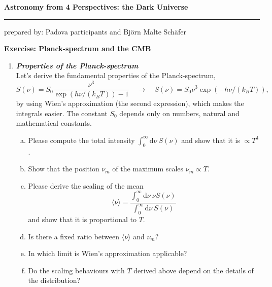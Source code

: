 \documentclass[a4paper,12pt]{article}
\newcommand{\question}[1]{\textbf{\textit{#1}}}
\newcommand{\HRule}{\rule{\linewidth}{0.3mm}}
\newcommand{\dd}{\mathrm{d}}
\newcommand{\bra}{\langle}
\newcommand{\ket}{\rangle}
\begin{document}
\pagestyle{empty}

\begin{center}
\LARGE \textbf{Astronomy from 4 Perspectives: the Dark Universe}
\HRule
\end{center}
\begin{flushright}
prepared by: Padova participants and Bj{\"o}rn Malte Sch{\"a}fer
\end{flushright}
\begin{center}
{\Large \textbf{Exercise: Planck-spectrum and the CMB}}
\end{center}
\vspace{5mm}

\begin{enumerate}

\item \question{Properties of the Planck-spectrum}\\
Let's derive the fundamental properties of the Planck-spectrum,
\begin{equation}
S(\nu) = S_0\frac{\nu^3}{\exp(h\nu/(k_BT))-1}
\quad\rightarrow\quad
S(\nu) = S_0\nu^3\exp(-h\nu/(k_BT)),
\end{equation}
by using Wien's approximation (the second expression), which makes the integrals easier. The constant $S_0$ depends only on numbers, natural and mathematical constants.
\begin{enumerate}[(a)]
\item{Please compute the total intensity $\int_0^\infty\dd\nu\:S(\nu)$ and show that it is $\propto T^4$.}
\item{Show that the position $\nu_m$ of the maximum scales $\nu_m\propto T$.}
\item{Please derive the scaling of the mean
\begin{equation}
\bra\nu\ket = \frac{\int_0^\infty\dd\nu\:\nu S(\nu)}{\int_0^\infty\dd\nu\:S(\nu)}
\end{equation}
and show that it is proportional to $T$.}
\item{Is there a fixed ratio between $\bra\nu\ket$ and $\nu_m$?}
\item{In which limit is Wien's approximation applicable?}
\item{Do the scaling behaviours with $T$ derived above depend on the details of the distribution?}
\end{enumerate}


\end{enumerate}
\end{document}
